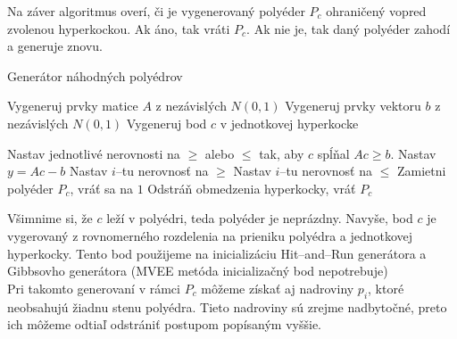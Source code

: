 Na záver algoritmus overí, či je vygenerovaný polyéder $P_c$ ohraničený vopred zvolenou hyperkockou. Ak áno, tak vráti $P_c$. Ak nie je, tak daný polyéder zahodí a generuje znovu.

\begin{algorithm}[H]
	\caption{Generátor náhodných polyédrov \cite{random_may}}
	\label{generator-polyedrov}
	\begin{algorithmic}[1]
		\State Vygeneruj prvky matice $A$ z nezávislých $N(0,1)$
		\State Vygeneruj prvky vektoru $b$ z nezávislých $N(0,1)$
		\State Vygeneruj bod $c$ v jednotkovej hyperkocke

		\State Nastav jednotlivé nerovnosti na $\geq$ alebo $\leq$ tak, aby $c$ spĺňal $Ac\geq b$.
		\State Nastav $y=Ac-b$
				\State Nastav $i$--tu nerovnosť na $\ge$
			\Else
				\State Nastav $i$--tu nerovnosť na $\le$
			\EndIf
		\EndFor
			\State Zamietni polyéder $P_c$, vráť sa na $1$
		\Else
			\State Odstráň obmedzenia hyperkocky, vráť $P_c$
		\EndIf
	\end{algorithmic}
\end{algorithm}

Všimnime si, že $c$ leží v polyédri, teda polyéder je neprázdny. Navyše, bod $c$ je vygerovaný z rovnomerného rozdelenia na prieniku polyédra a jednotkovej hyperkocky. Tento bod použijeme na inicializáciu Hit--and--Run generátora a Gibbsovho generátora (MVEE metóda inicializačný bod nepotrebuje)\\

Pri takomto generovaní v rámci $P_c$ môžeme získať aj nadroviny $p_i$, ktoré neobsahujú žiadnu stenu polyédra. Tieto nadroviny sú zrejme nadbytočné, preto ich môžeme odtiaľ odstrániť postupom popísaným vyššie.\\

